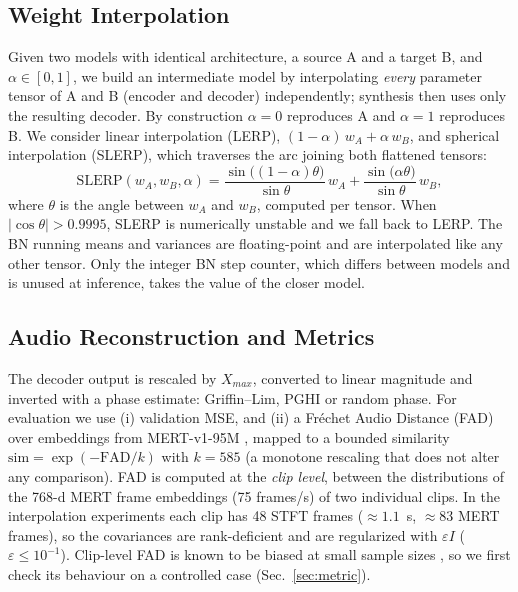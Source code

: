 \documentclass{article}
\begin{document}
\subsection{Weight Interpolation}
Given two models with identical architecture, a source A and a target B, and
$\alpha\in[0,1]$, we build an intermediate model by interpolating \emph{every}
parameter tensor of A and B (encoder and decoder) independently; synthesis then
uses only the resulting decoder. By construction $\alpha=0$ reproduces A and
$\alpha=1$ reproduces B. We consider linear interpolation (LERP),
$(1-\alpha)\,w_A + \alpha\,w_B$, and spherical interpolation (SLERP), which
traverses the arc joining both flattened tensors:
\begin{equation}\label{eq:slerp}
\mathrm{SLERP}(w_A,w_B,\alpha)=
\frac{\sin\!\big((1-\alpha)\theta\big)}{\sin\theta}\,w_A +
\frac{\sin\!\big(\alpha\theta\big)}{\sin\theta}\,w_B,
\end{equation}
where $\theta$ is the angle between $w_A$ and $w_B$, computed per tensor. When
$|\cos\theta|>0.9995$, SLERP is numerically unstable and we fall back to LERP.
The BN running means and variances are floating-point and are interpolated like
any other tensor. Only the integer BN step counter, which differs between models
and is unused at inference, takes the value of the closer model.

\subsection{Audio Reconstruction and Metrics}
The decoder output is rescaled by $X_{max}$, converted to linear magnitude and
inverted with a phase estimate: Griffin--Lim, PGHI \cite{prusa2017pghi} or random
phase. For evaluation we use (i) validation MSE, and (ii) a Fr\'echet Audio
Distance (FAD) \cite{gui2024adaptingfrechetaudiodistance} over embeddings from
MERT-v1-95M \cite{li2023mert}, mapped to a bounded similarity
$\mathrm{sim}=\exp(-\mathrm{FAD}/k)$ with $k=585$ (a monotone rescaling that does
not alter any comparison). FAD is computed at the \emph{clip level}, between the
distributions of the 768-d MERT frame embeddings (75 frames/s) of two individual
clips. In the interpolation experiments each clip has 48 STFT frames
($\approx1.1$~s, $\approx83$ MERT frames), so the covariances are rank-deficient
and are regularized with $\varepsilon I$ ($\varepsilon\le10^{-1}$). Clip-level
FAD is known to be biased at small sample sizes \cite{chung2025kad}, so we first
check its behaviour on a controlled case (Sec.~\ref{sec:metric}).
\end{document}
